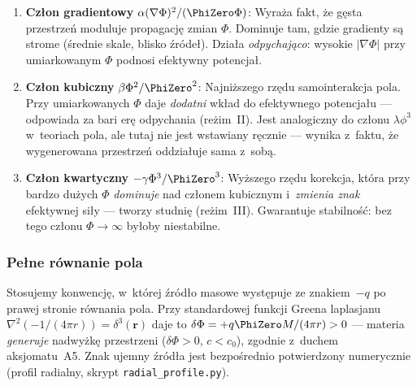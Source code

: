 \begin{enumerate}[nosep]
  \item \textbf{Cz\l{}on gradientowy}
    $\alpha(\nabla\Phi)^2/(\PhiZero\Phi)$:
    Wyra\.za fakt, \.ze g\k{e}sta przestrze\'n moduluje propagacj\k{e}
    zmian $\Phi$. Dominuje tam, gdzie gradienty s\k{a} strome
    (\'srednie skale, blisko \'zr\'ode\l{}). Dzia\l{}a \emph{odpychaj\k{a}co}:
    wysokie $|\nabla\Phi|$ przy umiarkowanym $\Phi$ podnosi
    efektywny potencja\l{}.

  \item \textbf{Cz\l{}on kubiczny} $\beta\Phi^2/\PhiZero^2$:
    Najni\.zszego rz\k{e}du samointerakcja pola. Przy umiarkowanych
    $\Phi$ daje \emph{dodatni} wk\l{}ad do efektywnego
    potencja\l{}u --- odpowiada za bari er\k{e} odpychania (re\.zim~II).
    Jest analogiczny do cz\l{}onu $\lambda\phi^3$ w~teoriach pola,
    ale tutaj nie jest wstawiany r\k{e}cznie --- wynika z~faktu,
    \.ze wygenerowana przestrze\'n oddzia\l{}uje sama z~sob\k{a}.

  \item \textbf{Cz\l{}on kwartyczny} $-\gamma\Phi^3/\PhiZero^3$:
    Wy\.zszego rz\k{e}du korekcja, kt\'ora przy bardzo du\.zych
    $\Phi$ \emph{dominuje} nad cz\l{}onem kubicznym i~\emph{zmienia
    znak} efektywnej si\l{}y --- tworzy studni\k{e} (re\.zim~III).
    Gwarantuje stabilno\'s\'c: bez tego cz\l{}onu $\Phi \to \infty$
    by\l{}oby niestabilne.
\end{enumerate}

\subsubsection{Pe\l{}ne r\'ownanie pola}

\begin{remark}\label{rem:sign-convention}
Stosujemy konwencj\k{e}, w~kt\'orej \'zr\'od\l{}o masowe wyst\k{e}puje
ze znakiem~$-q$ po prawej stronie r\'ownania pola. Przy standardowej
funkcji Greena laplasjanu $\nabla^2(-1/(4\pi r)) = \delta^3(\mathbf{r})$
daje to $\delta\Phi = +q\PhiZero M/(4\pi r) > 0$ --- materia
\emph{generuje} nadwy\.zk\k{e} przestrzeni ($\delta\Phi > 0$,
$c < c_0$), zgodnie z~duchem aksjomatu~A5. Znak ujemny \'zr\'od\l{}a
jest bezpo\'srednio potwierdzony numerycznie
(profil radialny, skrypt \texttt{radial\_profile.py}).
\end{remark}

